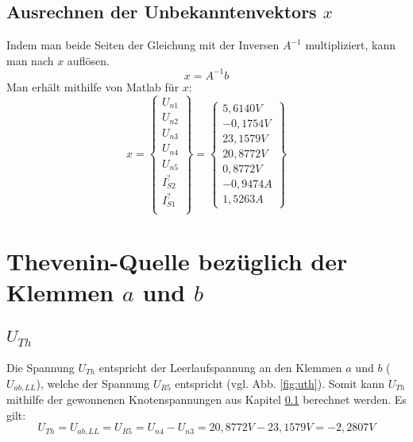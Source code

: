 \documentclass[11pt]{scrartcl}
\begin{document}
\subsection{Ausrechnen der Unbekanntenvektors $x$ } \label{sec:mat}
Indem man beide Seiten der Gleichung mit der Inversen $A^{-1}$ multipliziert, kann man nach $x$ auflösen.
\begin{equation*}
  x = A^{-1} b
\end{equation*}
Man erhält mithilfe von Matlab für $x$:
\begin{equation*}
  \renewcommand{\arraystretch}{1.5}
  x = \begin{Bmatrix}
    U_{n1} \\
    U_{n2} \\
    U_{n3} \\
    U_{n4} \\
    U_{n5} \\
    I_{S2}^? \\
    I_{S1}^? \\
  \end{Bmatrix} =
  \begin{Bmatrix}
    5,6140 \unit{V} \\
    -0,1754 \unit{V} \\
    23, 1579 \unit{V} \\
    20,8772 \unit{V} \\
    0,8772 \unit{V} \\
    -0,9474 \unit{A} \\
    1,5263 \unit{A}
  \end{Bmatrix}
\end{equation*}

\section{Thevenin-Quelle bezüglich der Klemmen $a$ und $b$}
\subsection{$U_{Th}$}
Die Spannung $U_{Th}$ entspricht der Leerlaufspannung an den Klemmen $a$ und $b$ ($U_{ab,LL}$),
welche der Spannung $U_{R5}$ entspricht (vgl. Abb. \ref{fig:uth}).
Somit kann $U_{Th}$ mithilfe der gewonnenen Knotenspannungen aus Kapitel \ref{sec:mat} berechnet werden. Es gilt:
\begin{equation*}
  U_{Th} = U_{ab,LL} = U_{R5} = U_{n4} - U_{n3} = 20,8772 \unit{V} - 23,1579 \unit{V} = -2,2807 \unit{V}
\end{equation*}
\end{document}
